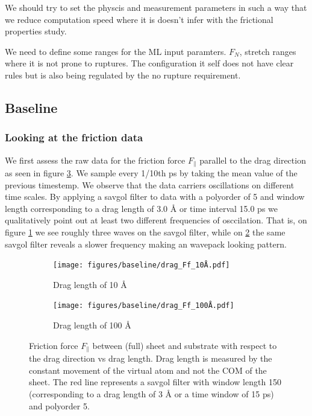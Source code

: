 We should try to set the physcis and measurement parameters in such a way that we reduce computation speed where it is doesn't infer with the frictional properties study.

We need to define some ranges for the ML input paramters. $F_N$, stretch ranges where it is not prone to ruptures. The configuration it self does not have clear rules but is also being regulated by the no rupture requirement. 

\newpage
\subsection{Baseline}

\subsubsection{Looking at the friction data}


We first assess the raw data for the friction force $F_{\parallel}$ parallel to the drag direction as seen in figure \ref{fig:drag_Ff}. We sample every 1/10th ps by taking the mean value of the previous timestemp. We observe that the data carriers oscillations on different time scales. By applying a savgol filter to data with a polyorder of 5 and window length corresponding to a drag length of 3.0 Å or time interval 15.0 ps we qualitatively point out at least two different frequencies of osccilation. That is, on figure \ref{fig:drag_Ff_10} we see roughly three waves on the savgol filter, while on \ref{fig:drag_Ff_100} the same savgol filter reveals a slower frequency making an wavepack looking pattern.

\begin{figure}[H]
  \centering
  \begin{subfigure}[b]{0.49\textwidth}
      \centering
      \texttt{[image: figures/baseline/drag\_Ff\_10Å.pdf]}
      \caption{Drag length of 10 Å}
      \label{fig:drag_Ff_10}
  \end{subfigure}
  \hfill
  \begin{subfigure}[b]{0.49\textwidth}
      \centering
      \texttt{[image: figures/baseline/drag\_Ff\_100Å.pdf]}
      \caption{Drag length of 100 Å}
      \label{fig:drag_Ff_100}
  \end{subfigure}
  \hfill
     \caption{Friction force $F_\parallel$ between (full) sheet and substrate with respect to the drag direction vs drag length. Drag length is measured by the constant movement of the virtual atom and not the COM of the sheet. The red line represents a savgol filter with window length 150 (corresponding to a drag length of 3 Å or a time window of 15 ps) and polyorder 5. }
     \label{fig:drag_Ff}
\end{figure}

